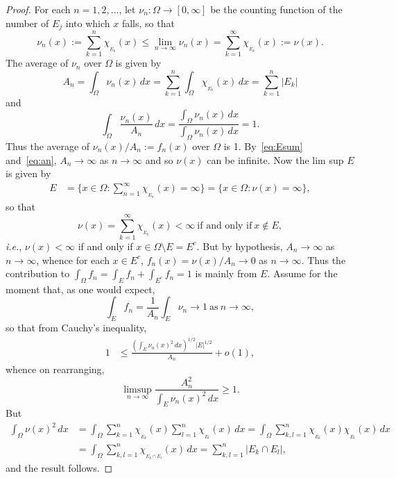 \documentclass[reqno]{amsart}
\renewcommand{\ge}{\geqslant}
\renewcommand{\le}{\leqslant}
\newcommand{\0}{{\mathbf{0}}}
\newcommand{\col}{\colon}
\newcommand{\cEk}{{\chi}_{_{E_k}}}
\newcommand{\cEkl}{{\chi}_{_{E_k\cap E_l}}}
\newcommand{\cEl}{{\chi}_{_{E_l}}}
\newcommand{\cEn}{{\chi}_{_{E_n}}}
\newcommand{\ie}{{\it{i.e.}}}
\begin{document}
\begin{proof}
  For each $n=1,2,\dots$, let $\nu_n\colon \Omega\to [0,\infty]$ be
  the counting function of the number of $E_j$ into which $x$ falls,
  so that
$$
\nu_n(x):=\sum_{k=1}^n \cEk(x)\le \lim_{n\to\infty}\nu_n(x) 
=\sum_{k=1}^\infty \cEk(x):=\nu(x). 
$$
 The average of $\nu_n$ over $\Omega$ is given by 
  \begin{equation}
    \label{eq:an}
 A_n =\int_\Omega \nu_n(x)\, dx = \sum_{k=1}^n \int_\Omega \cEk(x)\,dx =
  \sum_{k=1}^n |E_k|
  \end{equation}
  and 
 \begin{equation}
    \label{eq:int1}
   \int_\Omega \frac{\nu_n(x)}{A_n}\,dx
=\frac{\int_\Omega \nu_n(x)\,dx}{ \int_\Omega \nu_n(x)\, dx}=1.
 \end{equation}
 Thus the average of $\nu_n(x)/A_n:=f_n(x)$ over $\Omega$ is 1.
 By~\eqref{eq:Esum} and~\eqref{eq:an}, $A_n\to\infty$ as $n\to\infty$
 and so $\nu(x)$ can be infinite.  Now  the lim sup $E$ is given by
\begin{align*}
  E & = 
   \{x\in \Omega \col \sum_{n=1}^\infty \cEn(x)=\infty\} = \{x\in
  \Omega \col \nu(x)=\infty\}, 
\end{align*} 
so that 
 \begin{equation*}
\nu(x)=\sum_{k=1}^\infty \cEk(x)<\infty \ \text{if and only if} \ x\notin E,
 \end{equation*}
 \ie, $\nu(x)<\infty$ if and only if $x\in \Omega \setminus E= E^c$.  But by
 hypothesis, $A_n\to\infty$ as $n\to\infty$, whence for each $x\in
 E^c$, $f_n(x)=\nu(x)/A_n\to 0$ as $n\to\infty$.  Thus the
 contribution to $\int_\Omega f_n=\int_E f_n+\int_{E^c} f_n=1$ is
 mainly from $E$.  Assume for the moment that, as one would expect,
 \begin{equation}
\label{eq:limintfn}
\int_E f_n =\frac1{A_n} \int_E\nu_n \to 1 \ \text{as} \ n\to\infty, 
 \end{equation}
so that from Cauchy's inequality, 
\begin{align*}
1   &\le \frac{\left(\int_E \nu_n(x)^2 \,dx \right)^{1/2}|E|^{1/2}}{A_n}
  + o(1),
\end{align*}
whence on rearranging,
\begin{equation*}
\limsup_{n\to\infty}  \frac{A_n^2}{\int_E \nu_n(x)^2 \,dx}\ge 1. 
\end{equation*}
But 
\begin{align*}
\int_\Omega \nu(x)^2 \,dx & =   
\int_\Omega \sum_{k=1}^n \cEk(x)
\sum_{l=1}^n \cEl(x)\, dx = 
\int_\Omega  \sum_{k,l=1}^n \cEk(x) \cEl(x)\,dx \\ 
                    &= \int_\Omega  \sum_{k,l=1}^n \cEkl(x) \, dx 
=   \sum_{k,l=1}^n |E_k\cap E_{l}|,
\end{align*} 
and the result follows.


\end{proof}
\end{document}

